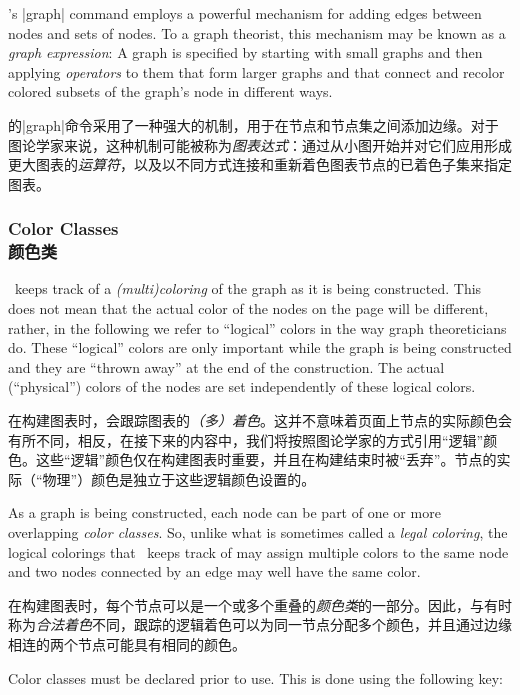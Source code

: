 \tikzname's |graph| command employs a powerful mechanism for adding edges
between nodes and sets of nodes. To a graph theorist, this mechanism may be
known as a \emph{graph expression}: A graph is specified by starting with small
graphs and then applying \emph{operators} to them that form larger graphs and
that connect and recolor colored subsets of the graph's node in different ways.

\tikzname 的|graph|命令采用了一种强大的机制，用于在节点和节点集之间添加边缘。对于图论学家来说，这种机制可能被称为\emph{图表达式}：通过从小图开始并对它们应用形成更大图表的\emph{运算符}，以及以不同方式连接和重新着色图表节点的已着色子集来指定图表。


\subsubsection{Color Classes\\颜色类}
\label{section-library-graph-coloring}

\tikzname\ keeps track of a \emph{(multi)coloring} of the graph as it is being
constructed. This does not mean that the actual color of the nodes on the page
will be different, rather, in the following we refer to ``logical'' colors in
the way graph theoreticians do. These ``logical'' colors are only important
while the graph is being constructed and they are ``thrown away'' at the end of
the construction. The actual (``physical'') colors of the nodes are set
independently of these logical colors.

在构建图表时，\tikzname 会跟踪图表的\emph{（多）着色}。这并不意味着页面上节点的实际颜色会有所不同，相反，在接下来的内容中，我们将按照图论学家的方式引用“逻辑”颜色。这些“逻辑”颜色仅在构建图表时重要，并且在构建结束时被“丢弃”。节点的实际（“物理”）颜色是独立于这些逻辑颜色设置的。

As a graph is being constructed, each node can be part of one or more
overlapping \emph{color classes}. So, unlike what is sometimes called a
\emph{legal coloring}, the logical colorings that \tikzname\ keeps track of may
assign multiple colors to the same node and two nodes connected by an edge may
well have the same color.

在构建图表时，每个节点可以是一个或多个重叠的\emph{颜色类}的一部分。因此，与有时称为\emph{合法着色}不同，\tikzname 跟踪的逻辑着色可以为同一节点分配多个颜色，并且通过边缘相连的两个节点可能具有相同的颜色。

Color classes must be declared prior to use. This is done using the following
key:

